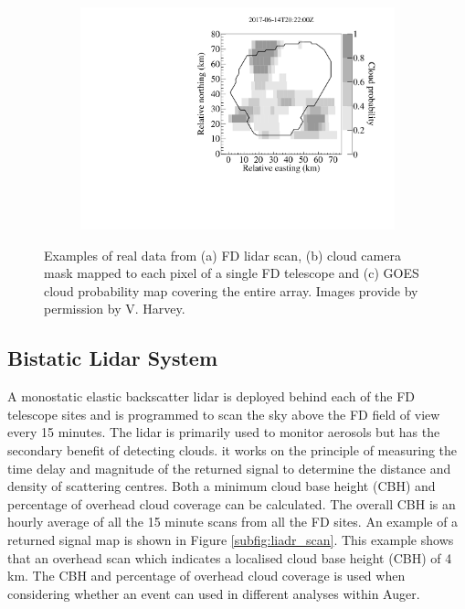 \begin{figure}
\begin{subfigure}[b]{0.3\textwidth}
\includegraphics[width=\textwidth]{chapters/graphs/CloudFlags/ir_cloudprobability_map.pdf}
\caption{} \label{subfig:GOES}
\end{subfigure}
\caption{Examples of real data from (a) FD lidar scan, (b) cloud camera mask mapped to each pixel of a single FD telescope and (c) GOES cloud probability map covering the entire array.  Images provide by permission by V. Harvey.}
\end{figure}

 
\subsection{Bistatic Lidar System}

A monostatic elastic backscatter lidar is deployed behind each of the FD telescope sites and is programmed to scan the sky above the FD field of view every 15 minutes. The lidar is primarily used to monitor aerosols but has the secondary benefit of detecting clouds. it works on the principle of measuring the time delay and magnitude of the returned signal to determine the distance and density of scattering centres. Both a minimum cloud base height (CBH) and percentage of overhead cloud coverage can be calculated. The overall CBH is an hourly average of all the 15 minute scans from all the FD sites. An example of a returned signal map is shown in Figure \ref{subfig:liadr_scan}. This example shows that an overhead scan which indicates a localised cloud base height (CBH) of 4 km. The CBH and percentage of overhead cloud coverage is used when considering whether an event can used in different analyses within Auger.  

